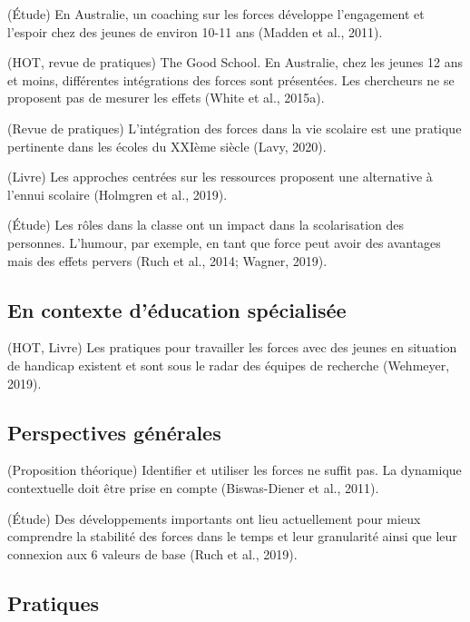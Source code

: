\documentclass[
  french,
]{article}
\begin{document}
(Étude) En Australie, un coaching sur les forces développe l'engagement et l'espoir chez des jeunes de environ 10-11 ans (Madden et al., 2011).

(HOT, revue de pratiques) The Good School. En Australie, chez les jeunes 12 ans et moins, différentes intégrations des forces sont présentées. Les chercheurs ne se proposent pas de mesurer les effets (White et al., 2015a).

(Revue de pratiques) L'intégration des forces dans la vie scolaire est une pratique pertinente dans les écoles du XXIème siècle (Lavy, 2020).

(Livre) Les approches centrées sur les ressources proposent une alternative à l'ennui scolaire (Holmgren et al., 2019).

(Étude) Les rôles dans la classe ont un impact dans la scolarisation des personnes. L'humour, par exemple, en tant que force peut avoir des avantages mais des effets pervers (Ruch et al., 2014; Wagner, 2019).

\hypertarget{en-contexte-duxe9ducation-spuxe9cialisuxe9e}{%
\subsection{En contexte d'éducation spécialisée}\label{en-contexte-duxe9ducation-spuxe9cialisuxe9e}}

(HOT, Livre) Les pratiques pour travailler les forces avec des jeunes en situation de handicap existent et sont sous le radar des équipes de recherche (Wehmeyer, 2019).

\hypertarget{perspectives-guxe9nuxe9rales}{%
\subsection{Perspectives générales}\label{perspectives-guxe9nuxe9rales}}

(Proposition théorique) Identifier et utiliser les forces ne suffit pas. La dynamique contextuelle doit être prise en compte (Biswas-Diener et al., 2011).

(Étude) Des développements importants ont lieu actuellement pour mieux comprendre la stabilité des forces dans le temps et leur granularité ainsi que leur connexion aux 6 valeurs de base (Ruch et al., 2019).

\hypertarget{pratiques-1}{%
\subsection{Pratiques}\label{pratiques-1}}
\end{document}
